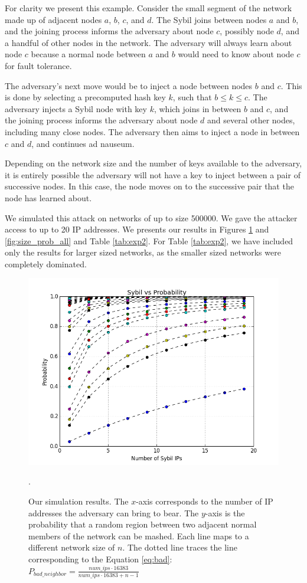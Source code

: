 \documentclass[a4paper]{article}
\begin{document}
For clarity we present this example. 
Consider the small segment of the network made up of adjacent nodes $a$, $b$, $c$, and $d$.
The Sybil joins between nodes $a$ and $b$, and the joining process informs the adversary about node $c$, possibly node $d$, and a handful of other nodes in the network.
The adversary will always learn about node $c$ because a normal node between $a$ and $b$ would need to know about node $c$ for fault tolerance.

The adversary's next move would be to inject a node between nodes $b$ and $c$.
This is done by selecting a precomputed hash key $k$, such that $b \leq k \leq c$.
The adversary injects a Sybil node with key $k$, which joins in between $b$ and $c$, and the joining process informs the adversary about node $d$ and several other nodes, including many close nodes.
The adversary then aims to inject a node in between $c$ and $d$, and continues ad nauseum.

Depending on the network size and the number of keys available to the adversary, it is entirely possible the adversary will not have a key to inject between a pair of successive nodes.
In this case, the node moves on to the successive pair that the node has learned about.


We simulated this attack on networks of up to size 500000.
We gave the attacker access to up to 20 IP addresses.
We presents our results in Figures \ref{fig:exp2} and \ref{fig:size_prob_all} and Table \ref{tab:exp2}.
For Table \ref{tab:exp2}, we have included only the results for larger sized networks, as the smaller sized networks were completely dominated.


\begin{figure}
\centering
\includegraphics[width=1\linewidth]{ip_prob_all}
\caption[foo]{Our simulation results.  
    The $x$-axis corresponds to the number of IP addresses the adversary can bring to bear.
    The $y$-axis is the probability that a random region between two adjacent normal members of the network can be mashed.
    Each line maps to a different network size of $n$.
    The dotted line traces the line corresponding to the Equation \ref{eq:bad}: $ P_{bad\_neighbor} =  \frac{num\_ips \cdot 16383}{num\_ips \cdot 16383 + n - 1}$}.
\label{fig:exp2}
\end{figure}
\end{document}
